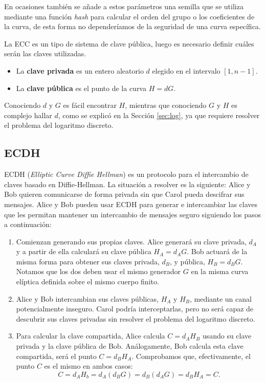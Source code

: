 \documentclass[11pt]{article}
\begin{document}
En ocasiones también se añade a estos parámetros una semilla que se utiliza mediante una función \textit{hash} para calcular el orden del grupo o los coeficientes de la curva, de esta forma no dependeríamos de la seguridad de una curva específica.

La ECC es un tipo de sistema de clave pública, luego es necesario definir cuáles serán las claves utilizadas.

\begin{itemize}
\item La \textbf{clave privada} es un entero aleatorio $d$ elegido en el intervalo $[1,n-1]$.
\item La \textbf{clave pública} es el punto de la curva $H = dG$.
\end{itemize}

Conociendo $d$ y $G$ es fácil encontrar $H$, mientras que conociendo $G$ y $H$ es complejo hallar $d$, como se explicó en la Sección \ref{sec:log}, ya que requiere resolver el problema del logaritmo discreto.


\subsection{ECDH}
ECDH (\textit{Elliptic Curve Diffie Hellman}) es un protocolo para el intercambio de claves basado en Diffie-Hellman. La situación a resolver es la siguiente: Alice y Bob quieren comunicarse de forma privada sin que Carol pueda descifrar sus mensajes. Alice y Bob pueden usar ECDH para generar e intercambiar las claves que les permitan mantener un intercambio de mensajes seguro siguiendo los pasos a continuación:

\begin{enumerate}
\item Comienzan generando sus propias claves. Alice generará su clave privada, $d_A$ y a partir de ella calculará su clave pública $H_A = d_AG$. Bob actuará de la misma forma para obtener sus claves privada, $d_B$, y pública, $H_B = d_BG$. Notamos que los dos deben usar el mismo generador $G$ en la misma curva elíptica definida sobre el mismo cuerpo finito.

\item Alice y Bob intercambian sus claves públicas, $H_A$ y $H_B$, mediante un canal potencialmente inseguro. Carol podría interceptarlas, pero no será capaz de descubrir sus claves privadas sin resolver el problema del logaritmo discreto.\\
\item Para calcular la clave compartida, Alice calcula $C = d_AH_B$ usando su clave privada y la clave pública de Bob. Análogamente, Bob calcula esta clave compartida, será el punto $C = d_BH_A$. Comprobamos que, efectivamente, el punto $C$ es el mismo en ambos casos:
  \[C = d_AH_b = d_A(d_BG) = d_B(d_AG) = d_BH_A = C.\]
\end{enumerate}
\end{document}
